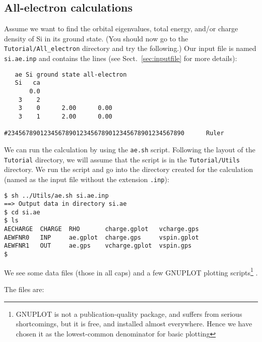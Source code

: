 \documentclass[11pt]{article}
\begin{document}
\subsection{All-electron calculations}

Assume we want to find the orbital eigenvalues, total energy, and/or
charge density of Si in its ground state. (You should now go to the
{\tt Tutorial/All\_electron} directory and try the following.)  Our
input file is named {\tt si.ae.inp} and contains the lines (see 
Sect.~\ref{sec:inputfile} for more details):

\begin{verbatim}
   ae Si ground state all-electron
   Si   ca
       0.0
    3    2
    3    0      2.00      0.00
    3    1      2.00      0.00

#2345678901234567890123456789012345678901234567890      Ruler
\end{verbatim}

We can run the calculation by using the {\tt ae.sh} script. Following
the layout of the {\tt Tutorial} directory, we will assume that the
script is in the {\tt Tutorial/Utils} directory. We run the
script and go into the directory created for the calculation (named
as the input file without the extension {\tt .inp}):

\begin{verbatim}
$ sh ../Utils/ae.sh si.ae.inp
==> Output data in directory si.ae
$ cd si.ae
$ ls
AECHARGE  CHARGE  RHO       charge.gplot   vcharge.gps
AEWFNR0   INP     ae.gplot  charge.gps     vspin.gplot
AEWFNR1   OUT     ae.gps    vcharge.gplot  vspin.gps
$
\end{verbatim}

We see some data files (those in all caps) and a few GNUPLOT plotting
scripts\footnote{GNUPLOT is not a publication-quality package, and
suffers from serious shortcomings, but it is free, and installed
almost everywhere. Hence we have chosen it as the lowest-common
denominator for basic plotting} . 

The files are:
\end{document}
